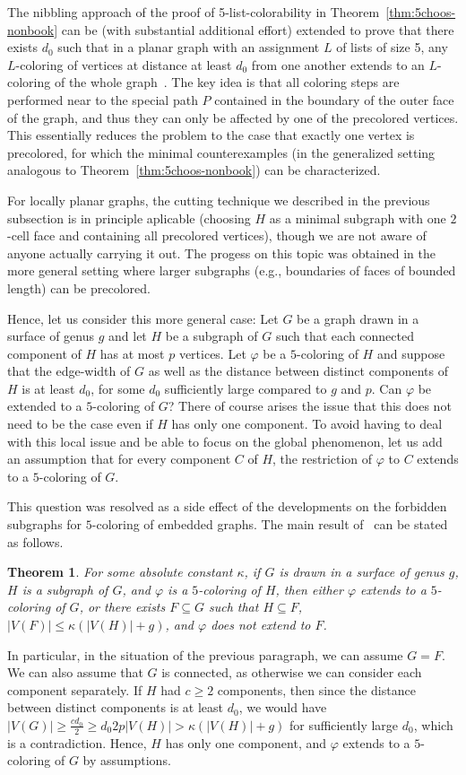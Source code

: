 \documentclass[12pt,twoside,openright,a4paper]{book}
\newtheorem{theorem}{Theorem}[chapter]
\begin{document}
The nibbling approach of the proof of 5-list-colorability in Theorem~\ref{thm:5choos-nonbook} can be (with substantial additional effort)
extended to prove that there exists $d_0$ such that in a planar graph with an assignment $L$ of lists of size 5, any $L$-coloring
of vertices at distance at least $d_0$ from one another extends to an $L$-coloring of the whole graph~\cite{LidDvoMohPos}.
The key idea is that all coloring steps are performed near to the special path $P$ contained in the boundary of the outer face
of the graph, and thus they can only be affected by one of the precolored vertices.  This essentially reduces the problem
to the case that exactly one vertex is precolored, for which the minimal counterexamples (in the generalized setting analogous
to Theorem~\ref{thm:5choos-nonbook}) can be characterized.

For locally planar graphs, the cutting technique we described in the previous subsection is in principle aplicable
(choosing $H$ as a minimal subgraph with one $2$-cell face and containing all precolored vertices), though we are
not aware of anyone actually carrying it out.  The progess on this topic was obtained in the more general setting
where larger subgraphs (e.g., boundaries of faces of bounded length) can be precolored.

Hence, let us consider this more general case: Let $G$ be a graph drawn in a surface of genus $g$ and let $H$
be a subgraph of $G$ such that each connected component of $H$ has at most $p$ vertices.  Let $\varphi$ be a $5$-coloring
of $H$ and suppose that the edge-width of $G$ as well as the distance between distinct components of $H$ is at least $d_0$,
for some $d_0$ sufficiently large compared to $g$ and $p$.  Can $\varphi$ be extended to a $5$-coloring of $G$?
There of course arises the issue that this does not need to be the case even if $H$ has only one component.
To avoid having to deal with this local issue and be able to focus on the global phenomenon, let us add
an assumption that for every component $C$ of $H$, the restriction of $\varphi$ to $C$ extends to a $5$-coloring of $G$.

This question was resolved as a side effect of the developments on the forbidden subgraphs for $5$-coloring of embedded graphs.
The main result of~\cite{pothom} can be stated as follows.
\begin{theorem}\label{thm:5hyperbol}
For some absolute constant $\kappa$, if $G$ is drawn in a surface of genus $g$, $H$ is a subgraph of $G$, and
$\varphi$ is a $5$-coloring of $H$, then either $\varphi$ extends to a $5$-coloring of $G$, or there exists
$F\subseteq G$ such that $H\subseteq F$, $|V(F)|\le \kappa(|V(H)|+g)$, and $\varphi$ does not extend to $F$.
\end{theorem}
In particular, in the situation of the previous paragraph, we can assume $G=F$.  We can also assume that $G$ is
connected, as otherwise we can consider each component separately.  If $H$ had $c\ge 2$ components, then since the distance between
distinct components is at least $d_0$, we would have $|V(G)|\ge \tfrac{cd_0}{2}\ge {d_0}{2p}|V(H)|>\kappa(|V(H)|+g)$
for sufficiently large $d_0$, which is a contradiction.  Hence, $H$ has only one component, and $\varphi$ extends to a $5$-coloring of $G$
by assumptions.
\end{document}

